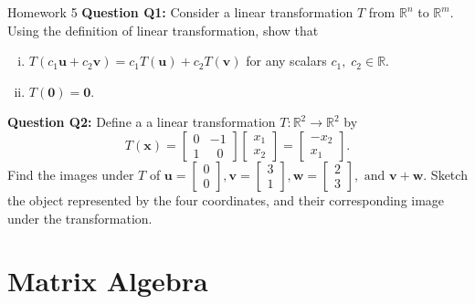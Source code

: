 \documentclass[10pt, aspectratio=169]{beamer}
\begin{document}
\begin{frame}{Homework 5}
\textbf{Question Q1:}
     Consider a linear transformation \( T \) from \( \mathbb{R}^n \) to \( \mathbb{R}^m \).
     Using the definition of linear transformation, show that
    \begin{enumerate}[(i)]
        \item \( T(c_1\mathbf{u} + c_2\mathbf{v}) = c_1T(\mathbf{u}) + c_2T(\mathbf{v}) \) for any scalars \( c_1,\; c_2 \in \mathbb{R}\).
        \item \( T(\mathbf{0}) = \mathbf{0} \).
    \end{enumerate}

\textbf{Question Q2:}
    Define a a linear transformation \( T : \mathbb{R}^2 \to \mathbb{R}^2 \) by
    \[
    T(\mathbf{x})
    = 
    \begin{bmatrix}
        0 & -1\\
        1 &  \;\;0 
    \end{bmatrix} 
    \begin{bmatrix}
        x_1\\
        x_2
    \end{bmatrix}
    =
    \begin{bmatrix}
        -x_2\\
        x_1
    \end{bmatrix}.
    \]
    Find the images under \(T\) of 
    \(
    \mathbf{u}=
    \begin{bmatrix}
        0\\
        0
    \end{bmatrix},
    \mathbf{v}=
    \begin{bmatrix}
        3\\
        1
    \end{bmatrix},
    \mathbf{w}=
    \begin{bmatrix}
        2\\
        3
    \end{bmatrix}, \text{ and }
    \mathbf{v} + \mathbf{w}.
    \)
    Sketch the object represented by the four coordinates, and their corresponding image under the transformation.
\end{frame}


\section{Matrix Algebra}
\end{document}
